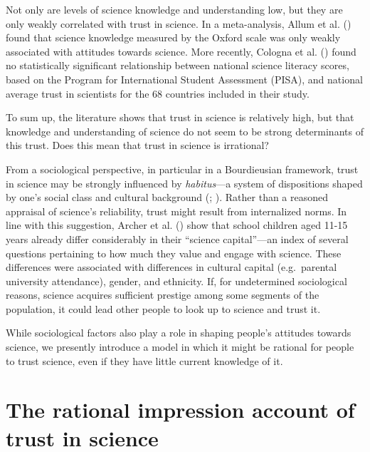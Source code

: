 \documentclass[
  man,
  floatsintext,
  longtable,
  nolmodern,
  notxfonts,
  notimes,
  colorlinks=true,linkcolor=blue,citecolor=blue,urlcolor=blue]{apa7}
\begin{document}
Not only are levels of science knowledge and understanding low, but they
are only weakly correlated with trust in science. In a meta-analysis,
Allum et al. ()
found that science knowledge measured by the Oxford scale was only
weakly associated with attitudes towards science. More recently, Cologna
et al. () found no
statistically significant relationship between national science literacy
scores, based on the Program for International Student Assessment
(PISA), and national average trust in scientists for the 68 countries
included in their study.

To sum up, the literature shows that trust in science is relatively
high, but that knowledge and understanding of science do not seem to be
strong determinants of this trust. Does this mean that trust in science
is irrational?

From a sociological perspective, in particular in a Bourdieusian
framework, trust in science may be strongly influenced by
\emph{habitus}---a system of dispositions shaped by one's social class
and cultural background
(; ). Rather than a reasoned appraisal of science's reliability, trust
might result from internalized norms. In line with this suggestion,
Archer et al. ()
show that school children aged 11-15 years already differ considerably
in their ``science capital''---an index of several questions pertaining
to how much they value and engage with science. These differences were
associated with differences in cultural capital (e.g.~parental
university attendance), gender, and ethnicity. If, for undetermined
sociological reasons, science acquires sufficient prestige among some
segments of the population, it could lead other people to look up to
science and trust it.

While sociological factors also play a role in shaping people's
attitudes towards science, we presently introduce a model in which it
might be rational for people to trust science, even if they have little
current knowledge of it.

\section{The rational impression account of trust in
science}\label{the-rational-impression-account-of-trust-in-science}
\end{document}
